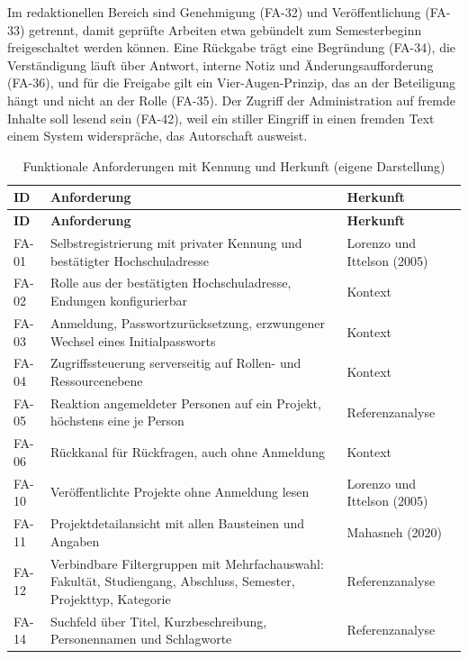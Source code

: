 Im redaktionellen Bereich sind Genehmigung (FA-32) und Veröffentlichung (FA-33) getrennt, damit geprüfte Arbeiten etwa gebündelt zum Semesterbeginn freigeschaltet werden können. Eine Rückgabe trägt eine Begründung (FA-34), die Verständigung läuft über Antwort, interne Notiz und Änderungsaufforderung (FA-36), und für die Freigabe gilt ein Vier-Augen-Prinzip, das an der Beteiligung hängt und nicht an der Rolle (FA-35). Der Zugriff der Administration auf fremde Inhalte soll lesend sein (FA-42), weil ein stiller Eingriff in einen fremden Text einem System widerspräche, das Autorschaft ausweist.

\begingroup
\footnotesize
\setlength{\tabcolsep}{4pt}
\renewcommand{\arraystretch}{1.05}
\setlength{\LTcapwidth}{\textwidth}
\begin{longtable}{@{}L{1.2cm}L{9.6cm}L{3.7cm}@{}}
	\caption[Funktionale Anforderungen mit Kennung und Herkunft]{Funktionale Anforderungen mit Kennung und Herkunft (eigene Darstellung)}
	\label{tab:fa}\\
	\toprule
	\textbf{ID} & \textbf{Anforderung} & \textbf{Herkunft} \\
	\midrule
	\endfirsthead
	\toprule
	\textbf{ID} & \textbf{Anforderung} & \textbf{Herkunft} \\
	\midrule
	\endhead
	\bottomrule
	\endfoot
	FA-01 & Selbstregistrierung mit privater Kennung und bestätigter Hochschuladresse & Lorenzo und Ittelson (2005) \\
	FA-02 & Rolle aus der bestätigten Hochschuladresse, Endungen konfigurierbar & Kontext \\
	FA-03 & Anmeldung, Passwortzurücksetzung, erzwungener Wechsel eines Initialpassworts & Kontext \\
	FA-04 & Zugriffssteuerung serverseitig auf Rollen- und Ressourcenebene & Kontext \\
	FA-05 & Reaktion angemeldeter Personen auf ein Projekt, höchstens eine je Person & Referenzanalyse \\
	FA-06 & Rückkanal für Rückfragen, auch ohne Anmeldung & Kontext \\
	FA-10 & Veröffentlichte Projekte ohne Anmeldung lesen & Lorenzo und Ittelson (2005) \\
	FA-11 & Projektdetailansicht mit allen Bausteinen und Angaben & Mahasneh (2020) \\
	FA-12 & Verbindbare Filtergruppen mit Mehrfachauswahl: Fakultät, Studiengang, Abschluss, Semester, Projekttyp, Kategorie & Referenzanalyse \\
	FA-14 & Suchfeld über Titel, Kurzbeschreibung, Personennamen und Schlagworte & Referenzanalyse \\

\end{longtable}
